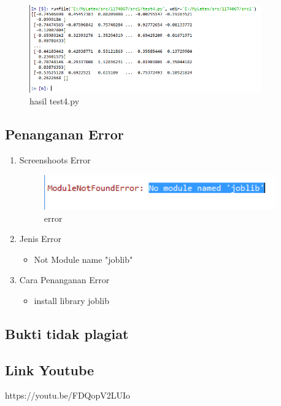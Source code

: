 \begin{enumerate}
			\begin{figure}[H]
				\begin{center}
				 \includegraphics[width=10cm]{figures/1174067/1/test4.png}
				 \caption{hasil test4.py}	
				\end{center}
			\end{figure}
	
	\end{enumerate}
	

\subsection{Penanganan Error}

	\begin{enumerate}
		\item Screenshoots Error
			\begin{figure}[H]
				\begin{center}
				 \includegraphics[width=10cm]{figures/1174067/1/error_1.png}
				 \caption{error}	
				\end{center}
			\end{figure}
			
		\item Jenis Error
			\begin{itemize}
				\item Not Module name "joblib"
			\end{itemize}
			
			\item Cara Penanganan Error
			\begin{itemize}
				\item install library joblib
			\end{itemize}
			
	\end{enumerate}
	
\subsection{Bukti tidak plagiat}

\subsection{Link Youtube}
https://youtu.be/FDQopV2LUIo
	